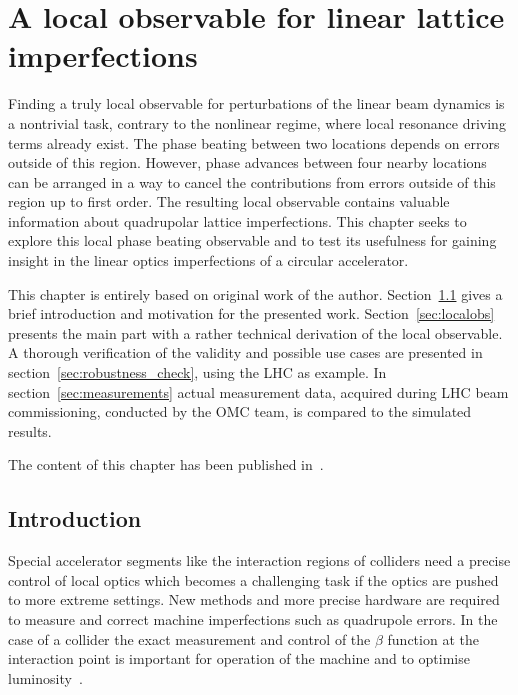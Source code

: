 \chapter{A local observable for linear lattice imperfections}
\label{ch_localobs}

\newcommand{\combtoangle}[3]{
  $\SI{#1}{\degree} - \SI{#2}{\degree} - \SI{#3}{\degree}$
}

\newcommand{\noiserms}{$0.7\times 10^{-3}\times 2\pi$ rad{}}
\newcommand{\highnoise}{$1.8\times 10^{-3}\times 2\pi$ rad{}}

\newcommand{\maxfigwidth}{8.5cm}

\begin{chapterinfo}
  Finding a truly local observable for perturbations of the linear beam dynamics is a nontrivial task,
  contrary to the nonlinear regime, where local resonance driving terms already exist.
  The phase beating between two locations depends on errors outside of this region.
  However, phase advances between four nearby locations can be arranged in a way to cancel
  the contributions from errors outside of this region up to first order.
  The resulting local observable contains valuable information about quadrupolar lattice imperfections.
  This chapter seeks to explore this local phase beating observable and to test its usefulness
  for gaining insight in the linear optics imperfections of a circular accelerator. 

  This chapter is entirely based on original work of the author. Section~\ref{sec_lobster_intro}
  gives a brief introduction and motivation for the presented work. Section~\ref{sec:localobs} presents
  the main part with a rather technical derivation of the local observable.
  A thorough verification of the validity and possible use cases are presented
  in section~\ref{sec:robustness_check}, using the LHC as example.
  In section~\ref{sec:measurements} actual measurement data, acquired during LHC beam commissioning,
  conducted by the OMC team, is compared to the simulated results.  
  
The content of this chapter has been published in~\cite{Wegscheider2020}.
\end{chapterinfo}



\section{Introduction}
\label{sec_lobster_intro}

Special accelerator segments like the interaction regions of colliders
need a precise control of local optics which becomes a challenging task
if the optics are pushed to more extreme settings. New methods and more
precise hardware are required to measure and correct machine
imperfections such as quadrupole errors. In the case of a collider the
exact measurement and control of the $\beta$ function at the interaction point is important for operation of
the machine and to optimise luminosity~\cite{Coello2020}.

